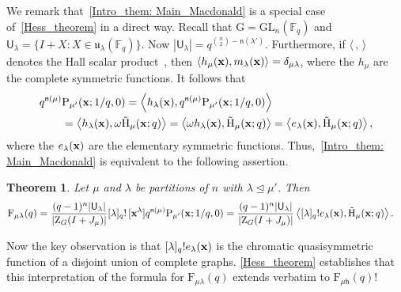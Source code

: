 \documentclass[12pt,a4paper,reqno]{amsart}
\theoremstyle{plain}
\newtheorem{theorem}{Theorem}[section]
\theoremstyle{definition}
\newcommand{\less}{\unlhd}
\newcommand{\FF}{{\mathbb{F}}}
\newcommand{\1}{\mathds{1}}
\newcommand{\G}{{\mathrm{G}}}
\newcommand{\GL}{\mathrm{GL}}
\renewcommand{\P}{\mathrm{P}}
\newcommand{\F}{\mathrm{F}}
\newcommand{\HH}{\mathrm{H}}
\newcommand{\Z}{\mathrm{Z}}
\renewcommand{\u}{\mathfrak{u}}
\newcommand{\x}{{\bf x}}
\newcommand{\U}{\mathsf{U}}
\newcommand{\fn}{\mathsf{n}}
\newcommand{\hes}{\mathsf{h}}
\begin{document}
We remark that~\cref{Intro_them: Main_Macdonald} is a special case of~\cref{Hess_theorem}  in a direct way.
Recall that $\G = \GL_n(\FF_q)$ and $\U_\lambda = \{I + X : X \in \u_\lambda(\FF_q)\}$. 
Now $|\U_\lambda|=q^{\binom{n}{2}-\fn(\lambda')}$. Furthermore,
if $\langle
\,,\,\rangle$ 
denotes the Hall scalar product~\cite[Sec. I.4]{Macdonald}, then
$\left\langle h_\mu(\x), m_\lambda(\x)\right\rangle = \delta_{\mu\lambda}$, where the $h_\mu$ are the complete symmetric functions.
It follows that
\begin{align*}
[\x^\lambda]\, q^{\fn(\mu)}&\P_{\mu'}(\x;1/q,0)=
\left\langle h_\lambda(\x), q^{\fn(\mu)}\P_{\mu'}(\x;1/q,0)\right\rangle\\
&=
\left\langle h_\lambda(\x),\omega\tilde{\HH}_{\mu}(\x; q)\right\rangle=
\left\langle\omega h_\lambda(\x),\tilde{\HH}_{\mu}(\x; q)\right\rangle
=
\left\langle e_\lambda(\x),\tilde{\HH}_{\mu}(\x; q)\right\rangle,
\end{align*}
where the $e_\lambda(\x)$ are the elementary symmetric functions. 
Thus,~\cref{Intro_them: Main_Macdonald} is equivalent to the following assertion.

\begin{theorem}\label{F_mulambda_G:thm} Let $\mu$ and $\lambda$ be partitions of $n$ with $\lambda\less \mu'$. Then 
\begin{align}\label{F_mulambda_G:eq}
    \F_{\mu\lambda}(q)&
    =\frac{(q-1)^n|\U_\lambda|}{|\Z_G(I+J_\mu)|} [\lambda]_q!\,  [\x^\lambda] q^{\fn(\mu)}\P_{\mu'}(\x;1/q,0)
    =\frac{(q-1)^n|\U_\lambda|}{|\Z_G(I+J_\mu)|}\left\langle [\lambda]_q!e_{\lambda}(\x),\tilde{\HH}_{\mu}(\x;q)\right\rangle.
\end{align}   
\end{theorem}
Now the key observation is that  $[\lambda]_q!e_\lambda(\x)$  is the chromatic quasisymmetric function of a disjoint union of complete graphs. 
\cref{Hess_theorem} establishes that this interpretation of the formula for $\F_{\mu\lambda}(q)$ extends  verbatim to $\F_{\mu \hes}(q)$!
\end{document}

